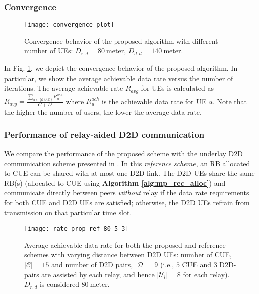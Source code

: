 \documentclass[twocolumn,10pt]{IEEEtran}
\begin{document}
\subsubsection{Convergence} 

\begin{figure}
\centering
\texttt{[image: convergence\_plot]}
\caption{Convergence behavior of the proposed algorithm with different number of UEs:  $D_{r,d} = 80~ \text{meter}$, $D_{d,d} = 140~ \text{meter}$.}
\label{fig:convergence_mp}
\end{figure}

In Fig. \ref{fig:convergence_mp}, we depict the convergence behavior of the proposed algorithm. In particular, we show the average achievable data
rate versus the number of iterations. The average achievable rate $R_{avg}$ for UEs is calculated as $R_{avg} =  \frac{ \displaystyle \sum_{u \in \lbrace\mathcal{C} \cup \mathcal{D} \rbrace} R_{u}^{ach}}{C+D}$ where $R_{u}^{ach}$ is the achievable data rate for UE $u$. Note that the higher
the number of users, the lower the average data rate.

\subsubsection{Performance of relay-aided D2D communication}

We compare the performance of the proposed scheme with the underlay D2D communication scheme presented in \cite{zul-d2d}. In this  \textit{reference scheme}, an RB allocated to CUE can be shared with at most one D2D-link. The D2D UEs share the same RB(s) (allocated to CUE using \textbf{Algorithm \ref{alg:mp_rec_alloc}}) and communicate directly between peers \textit{without} relay if the data rate requirements for both CUE and D2D UEs are satisfied; otherwise, the D2D UEs refrain from transmission on that particular time slot.


\begin{figure}
\centering
\texttt{[image: rate\_prop\_ref\_80\_5\_3]}
\caption{Average achievable data rate for both the proposed and reference schemes with varying distance between D2D UEs: number of CUE,  $|\mathcal{C}| = 15$ and number of D2D pairs,  $|\mathcal{D}| = 9$ (i.e., $5$ CUE and $3$ D2D-pairs are assisted by each relay, and hence $|\mathcal{U}_l| = 8$ for each relay).  $D_{r,d}$ is considered $80~ \text{meter}$. } 
\label{fig:rate_05_03_mp}
\end{figure}

\begin{figure*}
\centering
{}
\hfil 
{} 
\caption{(a)  Gain in aggregated achievable data rate and (b) Comparing gain with asymptotic upper bound using  the similar setup of Fig. \ref{fig:rate_05_03_mp}. There is a critical distance, beyond which relaying of D2D traffic provides significant performance gain.}
\label{fig:rate_gain_mp}
\end{figure*}
\end{document}
